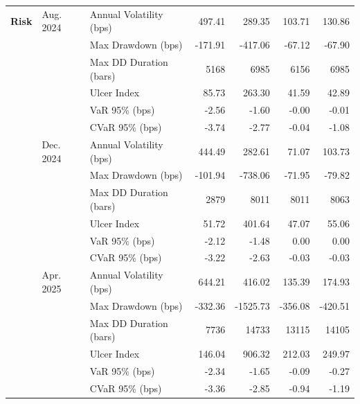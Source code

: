 \begin{table}[H]
{\begin{tabular*}{\textwidth}{@{\extracolsep{\fill}} l l l r r r r}
\textbf{Risk}
& Aug. 2024 & Annual Volatility (bps)   & 497.41   & 289.35     & 103.71   & 130.86 \\
&           & Max Drawdown (bps)        & -171.91  & -417.06    & -67.12   & -67.90 \\
&           & Max DD Duration (bars)    & 5168     & 6985       & 6156     & 6985 \\
&           & Ulcer Index               & 85.73    & 263.30     & 41.59    & 42.89 \\
&           & VaR 95\% (bps)            & -2.56    & -1.60      & -0.00    & -0.01 \\
&           & CVaR 95\% (bps)           & -3.74    & -2.77      & -0.04    & -1.08 \\
& Dec. 2024 & Annual Volatility (bps)   & 444.49   & 282.61     & 71.07    & 103.73 \\
&           & Max Drawdown (bps)        & -101.94  & -738.06    & -71.95   & -79.82 \\
&           & Max DD Duration (bars)    & 2879     & 8011       & 8011     & 8063 \\
&           & Ulcer Index               & 51.72    & 401.64     & 47.07    & 55.06 \\
&           & VaR 95\% (bps)            & -2.12    & -1.48      & 0.00     & 0.00 \\
&           & CVaR 95\% (bps)           & -3.22    & -2.63      & -0.03    & -0.03 \\
& Apr. 2025 & Annual Volatility (bps)   & 644.21   & 416.02     & 135.39    & 174.93 \\
&           & Max Drawdown (bps)        & -332.36  & -1525.73   & -356.08   & -420.51 \\
&           & Max DD Duration (bars)    & 7736     & 14733      & 13115     & 14105 \\
&           & Ulcer Index               & 146.04   & 906.32     & 212.03    & 249.97 \\
&           & VaR 95\% (bps)            & -2.34    & -1.65      & -0.09     & -0.27 \\
&           & CVaR 95\% (bps)           & -3.36    & -2.85      & -0.94     & -1.19 \\
\midrule


\end{tabular*}}
\end{table}
